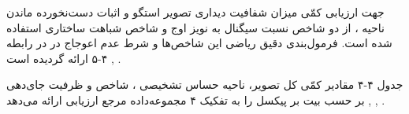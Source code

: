 

جهت ارزیابی کمّی میزان شفافیت دیداری تصویر استگو  و اثبات دست‌نخورده ماندن ناحیه ، از دو شاخص نسبت سیگنال به نویز اوج  و شاخص شباهت ساختاری  استفاده شده است. فرمول‌بندی دقیق ریاضی این شاخص‌ها و شرط عدم اعوجاج در  در رابطه ۴{-}۵ ارائه گردیده است , .\par






جدول ۴{-}۴ مقادیر کمّی  کل تصویر،  ناحیه حساس تشخیصی ، شاخص  و ظرفیت جای‌دهی  بر حسب بیت بر پیکسل  را به تفکیک ۴ مجموعه‌داده مرجع ارزیابی ارائه می‌دهد , , .\par



